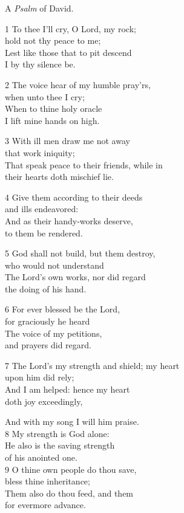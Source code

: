 \begin{multicols}{3}
A \emph{Psalm} of David.

1 To thee I’ll cry, O Lord, my rock;\\
hold not thy peace to me;\\
Lest like those that to pit descend\\
I by thy silence be.

2 The voice hear of my humble pray’rs,\\
when unto thee I cry;\\
When to thine holy oracle\\
I lift mine hands on high.

3 With ill men draw me not away\\
that work iniquity;\\
That speak peace to their friends, while in\\
their hearts doth mischief lie.

4 Give them according to their deeds\\
and ills endeavored:\\
And as their handy-works deserve,\\
to them be rendered.

5 God shall not build, but them destroy,\\
who would not understand\\
The Lord’s own works, nor did regard\\
the doing of his hand.

6 For ever blessed be the Lord,\\
for graciously he heard\\
The voice of my petitions,\\
and prayers did regard.

7 The Lord’s my strength and shield; my heart\\
upon him did rely;\\
And I am helped: hence my heart\\
doth joy exceedingly,

And with my song I will him praise.\\
8 My strength is God alone:\\
He also is the saving strength\\
of his anointed one.\\

9 O thine own people do thou save,\\
bless thine inheritance;\\
Them also do thou feed, and them\\
for evermore advance.


\end{multicols}
